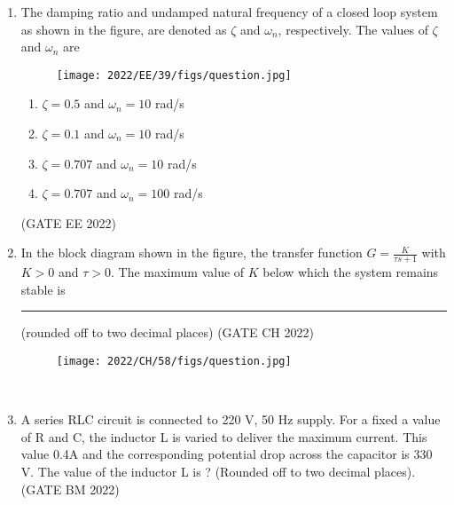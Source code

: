 \begin{enumerate}[label=\thechapter.\arabic*,ref=\thechapter.\theenumi]

\item The damping ratio and undamped natural frequency of a closed loop system as
shown in the figure, are denoted as $\zeta$ and $\omega_n$, respectively. The values of $\zeta$ and $\omega_n$
are 
\begin{figure}[!ht]
\centering
\begin{center}
\texttt{[image: 2022/EE/39/figs/question.jpg]}
\end{center}
\end{figure}
\begin{enumerate}
    \item $\zeta = 0.5$ and $\omega_n = 10$ rad/s
    \item $\zeta = 0.1$ and $\omega_n = 10$ rad/s
    \item $\zeta = 0.707$ and $\omega_n = 10$ rad/s
    \item $\zeta = 0.707$ and $\omega_n = 100$ rad/s
\end{enumerate}
\hfill(GATE EE 2022)
\solution

\newpage
\item In the block diagram shown in the figure, the transfer function $G=\frac{K}{\tau s+1}$ with $K>0$ and $\tau>0$. The maximum value of $K$ below which the system remains stable is \rule{1cm}{0.15mm}(rounded off to two decimal places) \hfill (GATE CH 2022) 
\begin{figure}[htbp] 
\texttt{[image: 2022/CH/58/figs/question.jpg]} 
\end{figure}\\ 
\solution 
 
\newpage

\item
A series RLC circuit is connected to 220 V, 50 Hz supply. For a fixed a value of R and C, the inductor L is varied to deliver the maximum current. This value 0.4A and the corresponding potential drop across the capacitor is 330 V. The value of the inductor L is ? (Rounded off to two decimal places).
\hfill{(GATE BM 2022)}\\
 \solution
  
 \newpage
 

\end{enumerate}
